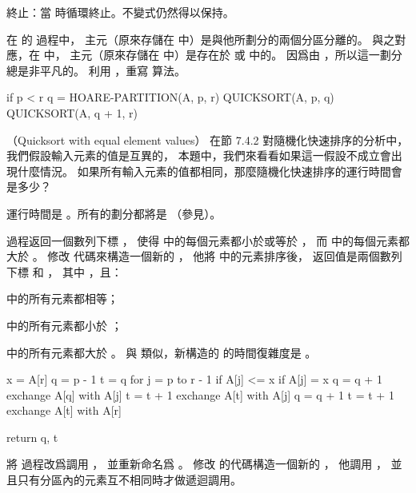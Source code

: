 {\EMP 終止：}當  時循環終止。不變式仍然得以保持。
\stopANSWER

\stopigBase

在 的  過程中，
主元（原來存儲在  中）是與他所劃分的兩個分區分離的。
與之對應，在  中，
主元（原來存儲在  中）是存在於  或  中的。
因爲由 ，所以這一劃分總是非平凡的。
\startigBase[a,continue]
\startitem
利用 ，重寫  算法。
\stopitem

\startANSWER
{}
\startCLRS
if p < r
	q = HOARE-PARTITION(A, p, r)
	QUICKSORT(A, p, q)
	QUICKSORT(A, q + 1, r)
\stopCLRS
\stopANSWER
\stopigBase
\stopPROBLEM

（Quicksort with equal element values）
在節 7.4.2 對隨機化快速排序的分析中，
我們假設輸入元素的值是互異的，
本題中，我們來看看如果這一假設不成立會出現什麼情況。
\startigBase[a]
\startitem
如果所有輸入元素的值都相同，那麼隨機化快速排序的運行時間會是多少？
\stopitem

\startANSWER
運行時間是 。所有的劃分都將是  （參見）。
\stopANSWER

\startitem
{} 過程返回一個數列下標 ，
使得  中的每個元素都小於或等於 ，
而  中的每個元素都大於 。
修改  代碼來構造一個新的 ，
他將  中的元素排序後，
返回值是兩個數列下標  和 ，
其中 ，且：
\startigBase
\item {} 中的所有元素都相等；
\item {} 中的所有元素都小於 ；
\item {} 中的所有元素都大於 。
\stopigBase
與  類似，新構造的  的時間復雜度是 。
\stopitem

\startANSWER
{}
\startCLRS
x = A[r]
q = p - 1
t = q
for j = p to r - 1
	if A[j] <= x
		if A[j] = x
			q = q + 1
			exchange A[q] with A[j]
		t = t + 1
		exchange A[t] with A[j]
q = q + 1
t = t + 1
exchange A[t] with A[r]

return q, t
\stopCLRS
\stopANSWER

\startitem
將  過程改爲調用 ，
並重新命名爲 。
修改  的代碼構造一個新的 ，
他調用 ，
並且只有分區內的元素互不相同時才做遞迴調用。
\stopitem

